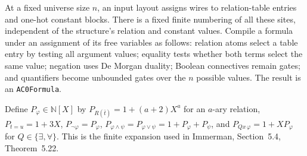 \begin{definition}
  \label{def:desc-circuit-expansion}
  \leanok
  At a fixed universe size $n$, an input layout assigns wires to relation-table
  entries and one-hot constant blocks. There is a fixed finite numbering of all
  these sites, independent of the structure's relation and constant values.
  Compile a formula under an assignment of its free variables as follows:
  relation atoms select a table entry by testing all argument values; equality
  tests whether both terms select the same value; negation uses De Morgan
  duality; Boolean connectives remain gates; and quantifiers become unbounded
  gates over the $n$ possible values. The result is an \texttt{AC0Formula}.

  Define $P_\varphi\in\mathbb N[X]$ by
  $P_{R(\bar t)}=1+(a+2)X^a$ for an $a$-ary relation,
  $P_{t=u}=1+3X$, $P_{\neg\varphi}=P_\varphi$,
  $P_{\varphi\wedge\psi}=P_{\varphi\vee\psi}=1+P_\varphi+P_\psi$, and
  $P_{Qx\,\varphi}=1+XP_\varphi$ for $Q\in\{\exists,\forall\}$.
  This is the finite expansion used in Immerman, Section~5.4, Theorem~5.22.
\end{definition}

